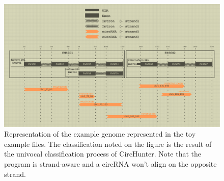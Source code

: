 \documentclass[letterpaper,12pt]{article}
\begin{document}
\begin{landscape}
\begin{figure}[th]
    \centering
    \includegraphics[scale=0.5]{toyexample.pdf}
    \caption{Representation of the example genome represented in the toy example files. The classification noted on the figure is the result of the univocal classification process of CircHunter. Note that the program is strand-aware and a circRNA won't align on the opposite strand.}
    \label{fig:toyexample}
\end{figure}
\end{landscape}
\end{document}
